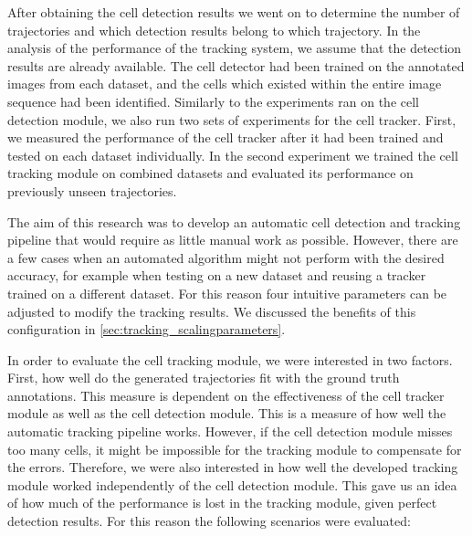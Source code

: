 	After obtaining the cell detection results we went on to determine the number of trajectories and which detection results belong to which trajectory. In the analysis of the performance of the tracking system, we assume that the detection results are already available. The cell detector had been trained on the annotated images from each dataset, and the cells which existed within the entire image sequence had been identified. Similarly to the experiments ran on the cell detection module, we also run two sets of experiments for the cell tracker. First, we measured the performance of the cell tracker after it had been trained and tested on each dataset individually. In the second experiment we trained the cell tracking module on combined datasets and evaluated its performance on previously unseen trajectories.
	
	The aim of this research was to develop an automatic cell detection and tracking pipeline that would require as little manual work as possible. However, there are a few cases when an automated algorithm might not perform with the desired accuracy, for example when testing on a new dataset and reusing a tracker trained on a different dataset. For this reason four intuitive parameters can be adjusted to modify the tracking results. We discussed the benefits of this configuration in \cref{sec:tracking_scalingparameters}.
	
	In order to evaluate the cell tracking module, we were interested in two factors. First, how well do the generated trajectories fit with the ground truth annotations. This measure is dependent on the effectiveness of the cell tracker module as well as the cell detection module. This is a measure of how well the automatic tracking pipeline works. However, if the cell detection module misses too many cells, it might be impossible for the tracking module to compensate for the errors. Therefore, we were also interested in how well the developed tracking module worked independently of the cell detection module. This gave us an idea of how much of the performance is lost in the tracking module, given perfect detection results. For this reason the following scenarios were evaluated:
	
